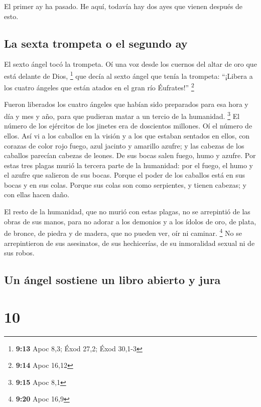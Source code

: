  El primer ay ha pasado. He aquí, todavía hay dos ayes
que vienen después de esto.

\hypertarget{la-sexta-trompeta-o-el-segundo-ay}{%
\subsection{La sexta trompeta o el segundo
ay}\label{la-sexta-trompeta-o-el-segundo-ay}}

 El sexto ángel tocó la trompeta. Oí una voz desde los
cuernos del altar de oro que está delante de Dios, \footnote{\textbf{9:13}
  Apoc 8,3; Éxod 27,2; Éxod 30,1-3}  que decía al sexto
ángel que tenía la trompeta: ``¡Libera a los cuatro ángeles que están
atados en el gran río Éufrates!'' \footnote{\textbf{9:14} Apoc 16,12}

 Fueron liberados los cuatro ángeles que habían sido
preparados para esa hora y día y mes y año, para que pudieran matar a un
tercio de la humanidad. \footnote{\textbf{9:15} Apoc 8,1}
 El número de los ejércitos de los jinetes era de
doscientos millones. Oí el número de ellos.  Así vi a los
caballos en la visión y a los que estaban sentados en ellos, con corazas
de color rojo fuego, azul jacinto y amarillo azufre; y las cabezas de
los caballos parecían cabezas de leones. De sus bocas salen fuego, humo
y azufre.  Por estas tres plagas murió la tercera parte
de la humanidad: por el fuego, el humo y el azufre que salieron de sus
bocas.  Porque el poder de los caballos está en sus bocas
y en sus colas. Porque sus colas son como serpientes, y tienen cabezas;
y con ellas hacen daño.

 El resto de la humanidad, que no murió con estas plagas,
no se arrepintió de las obras de sus manos, para no adorar a los
demonios y a los ídolos de oro, de plata, de bronce, de piedra y de
madera, que no pueden ver, oír ni caminar. \footnote{\textbf{9:20} Apoc
  16,9}  No se arrepintieron de sus asesinatos, de sus
hechicerías, de su inmoralidad sexual ni de sus robos.

\hypertarget{un-uxe1ngel-sostiene-un-libro-abierto-y-jura}{%
\subsection{Un ángel sostiene un libro abierto y
jura}\label{un-uxe1ngel-sostiene-un-libro-abierto-y-jura}}

\hypertarget{section-9}{%
\section{10}\label{section-9}}

